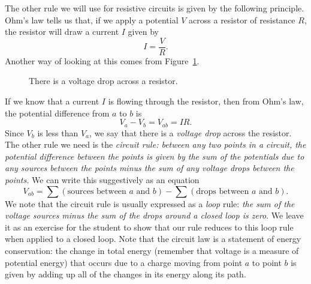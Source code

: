 The other rule we will use for resistive circuits is given by the following
principle.  Ohm's law tells us that, if we apply a potential $V$ across a
resistor of resistance $R$, the resistor will draw a current $I$ given by
$$
I=\frac{V}{R}.     
$$ 
Another way of looking at this comes from Figure~\ref{fig:DC:ohm}.
\begin{figure}[htb]
\centerline{\epsfxsize=4cm }
\caption{There is a voltage drop across a resistor.}
\label{fig:DC:ohm}
\end{figure}
If we know that a current $I$ is flowing through the resistor, then from Ohm's 
law, the potential difference from $a$ to $b$ is 
$$
V_a-V_b  = V_{ab} = IR.
$$
Since $V_b$ is less than $V_a$, we say that there is a {\it voltage drop}
across the resistor.  The other rule we need is the 
{\it circuit rule: between any two points in a circuit, the potential 
difference between the points is given by the sum of the potentials due to 
any sources between the points minus the sum of any voltage drops between the 
points.}  We can write this suggestively as an equation 
\begin{equation}
V_{ab} = \sum (\mbox{sources between $a$ and $b$}) 
- \sum (\mbox{drops between $a$ and $b$}). \label{eq:DC:circuitrule}
\end{equation}
We note that the circuit rule is usually expressed as a {\it loop} rule: 
{\it the sum of the voltage sources minus the sum of the drops around a closed 
loop is zero}.  We leave it as an exercise for the student to show that our 
rule reduces to this loop rule when applied to a closed loop. Note that the 
circuit law is a statement of energy conservation: the change in total energy 
(remember that voltage is a measure of potential energy) that occurs due to a 
charge moving from point $a$ to point $b$ is given by adding up all of the 
changes in its energy along its path.


